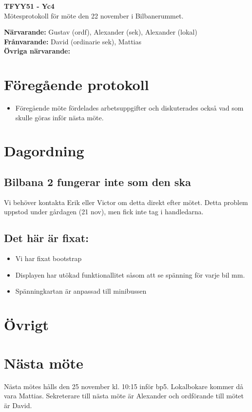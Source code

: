 \documentclass[11pt,a4paper]{article}
\begin{document}
    \begin{center}
        \textbf{\Large TFYY51 - Yc4} \\[0.2em]
        Mötesprotokoll för möte den 22 november i Bilbanerummet.
    \end{center}
    \vspace{1em}
    \textbf{Närvarande:} Gustav (ordf), Alexander (sek), Alexander (lokal) \\[0.5em]
    \textbf{Frånvarande:} David (ordinarie sek), Mattias \\[0.5em]  %
    \textbf{Övriga närvarande:}

    \section*{Föregående protokoll}
    \begin{itemize}
        \item Föregående möte fördelades arbetsuppgifter och diskuterades också vad som skulle göras inför nästa möte.\
    \end{itemize}

    \section*{Dagordning}
    \subsection*{Bilbana 2 fungerar inte som den ska}
	    Vi behöver kontakta Erik eller Victor om detta direkt efter mötet. Detta problem uppstod under gårdagen (21 nov), men fick inte tag i handledarna.
	    \subsection*{Det här är fixat:}
	     
	    \begin{itemize}
	    	\item Vi har fixat bootstrap
	    	\item Displayen har utökad funktionallitet såsom att se spänning för varje bil mm. 
	    	\item Spänningkartan är anpassad till minibussen
	    \end{itemize}
    \section*{Övrigt}
    

    \section*{Nästa möte}
    Nästa mötes hålls den 25 november kl. 10:15 inför bp5. Lokalbokare kommer då vara Mattias. Sekreterare till nästa möte är Alexander och ordförande till mötet är David.  
\end{document}
